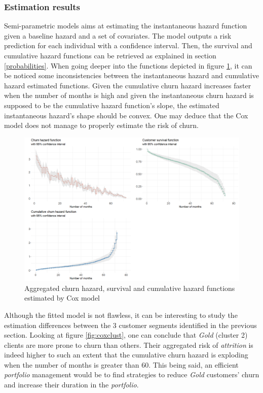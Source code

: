 \documentclass[
]{book}
\begin{document}
\hypertarget{estimation-results}{%
\subsubsection*{Estimation results}\label{estimation-results}}

Semi-parametric models aims at estimating the instantaneous hazard function given a baseline hazard and a set of covariates. The model outputs a risk prediction for each individual with a confidence interval. Then, the survival and cumulative hazard functions can be retrieved as explained in section \ref{probabilities}. When going deeper into the functions depicted in figure \ref{fig:coxdataviz}, it can be noticed some inconsistencies between the instantaneous hazard and cumulative hazard estimated functions. Given the cumulative churn hazard increases faster when the number of months is high and given the instantaneous churn hazard is supposed to be the cumulative hazard function's slope, the estimated instantaneous hazard's shape should be convex. One may deduce that the Cox model does not manage to properly estimate the risk of churn.

\begin{figure}

{\centering \includegraphics[width=20.83in]{./imgs/cox_data_viz} 

}

\caption{Aggregated churn hazard, survival and cumulative hazard functions estimated by Cox model}\label{fig:coxdataviz}
\end{figure}

Although the fitted model is not flawless, it can be interesting to study the estimation differences between the 3 customer segments identified in the previous section. Looking at figure \ref{fig:coxclust}, one can conclude that \emph{Gold} (cluster 2) clients are more prone to churn than others. Their aggregated risk of \emph{attrition} is indeed higher to such an extent that the cumulative churn hazard is exploding when the number of months is greater than 60. This being said, an efficient \emph{portfolio} management would be to find strategies to reduce \emph{Gold} customers' churn and increase their duration in the \emph{portfolio}.
\end{document}
